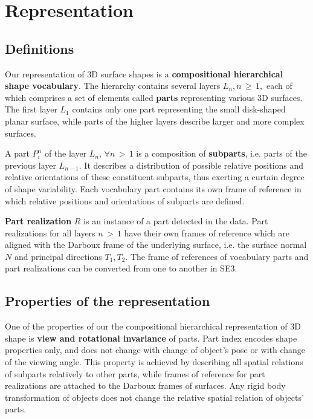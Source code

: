 \documentclass[conference]{IEEEtran}
\begin{document}
{\section{Representation\label{sec:Representation}}

\subsection{Definitions\label{sec:Definitions}}

Our representation of 3D surface shapes is a \textbf{compositional
hierarchical shape vocabulary}. The hierarchy contains several
layers $L_n, n\,{\geqslant}\,1,$ each of which comprises a set of
elements called \textbf{parts} representing various 3D surfaces. The
first layer $L_1$ contains only one part representing the small
disk-shaped planar surface, while parts of the higher layers
describe larger and more complex surfaces.

A part $P_{i}^n$ of the layer $L_n$, $\forall n\,{>}\,1$ is a
composition of \textbf{subparts}, i.e. parts of the previous layer
$L_{n-1}$. It describes a distribution of possible relative
positions and relative orientations of these constituent subparts,
thus exerting a curtain degree of shape variability. Each vocabulary
part contains its own frame of reference in which relative positions
and orientations of subparts are defined.

\textbf{Part realization} $R$ is an instance of a part detected in
the data. Part realizations for all layers $n\,{>}\,1$ have their
own frames of reference which are aligned with the Darboux frame of
the underlying surface, i.e. the surface normal $N$ and principal
directions $T_1, T_2$. The frame of references of vocabulary parts
and part realizations can be converted from one to another in SE3.

\subsection{Properties of the representation\label{sec:Properties}}

One of the properties of our the compositional hierarchical
representation of 3D shape is \textbf{view and rotational
invariance} of parts. Part index encodes shape properties only, and
does not change with change of object's pose or with change of the
viewing angle. This property is achieved by describing all spatial
relations of subparts relatively to other parts, while frames of
reference for part realizations are attached to the Darboux frames
of surfaces. Any rigid body transformation of objects does not
change the relative spatial relation of objects' parts.

}
\end{document}

